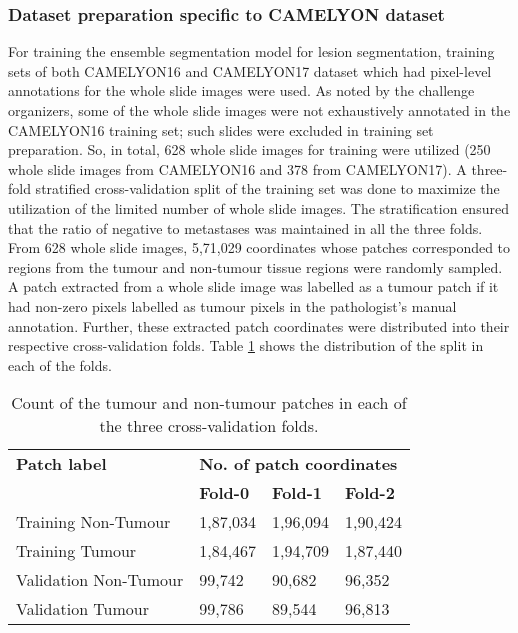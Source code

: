 \documentclass[times,twocolumn,final,authoryear]{tmp}
\begin{document}
\subsubsection{Dataset preparation specific to CAMELYON dataset}
For training the ensemble segmentation model for lesion segmentation, training sets of both CAMELYON16 and CAMELYON17 dataset which had pixel-level annotations for the whole slide images were used. As noted by the challenge organizers, some of the whole slide images were not exhaustively annotated in the CAMELYON16 training set; such slides were excluded in training set preparation. So, in total, 628 whole slide images for training were utilized (250 whole slide images from CAMELYON16 and 378 from CAMELYON17). A three-fold stratified cross-validation split of the training set was done to maximize the utilization of the limited number of whole slide images. The stratification ensured that the ratio of negative to metastases was maintained in all the three folds. From 628 whole slide images, 5,71,029 coordinates whose patches corresponded to regions from the tumour and non-tumour tissue regions were randomly sampled. A patch extracted from a whole slide image was labelled as a tumour patch if it had non-zero pixels labelled as tumour pixels in the pathologist’s manual annotation. Further, these extracted patch coordinates were distributed into their respective cross-validation folds. Table \ref{path_tab:fold_dist}  shows the distribution of the split in each of the folds.

\begin{table}
\centering
\caption{Count of the tumour and non-tumour patches in each of the three cross-validation folds.
}
\label{path_tab:fold_dist}
\begin{tabular}{@{}llll@{}}
  
\textbf{Patch label} & \multicolumn{3}{l}{\textbf{No. of patch coordinates}} \\    
                     & \textbf{Fold-0}          & \textbf{Fold-1}          & \textbf{Fold-2}         \\
Training Non-Tumour   & 1,87,034           & 1,96,094           & 1,90,424          \\
Training Tumour       & 1,84,467           & 1,94,709           & 1,87,440          \\
Validation Non-Tumour & 99,742            & 90,682            & 96,352           \\
Validation Tumour     & 99,786            & 89,544            & 96,813           \\  
\end{tabular}\end{table}
\end{document}
